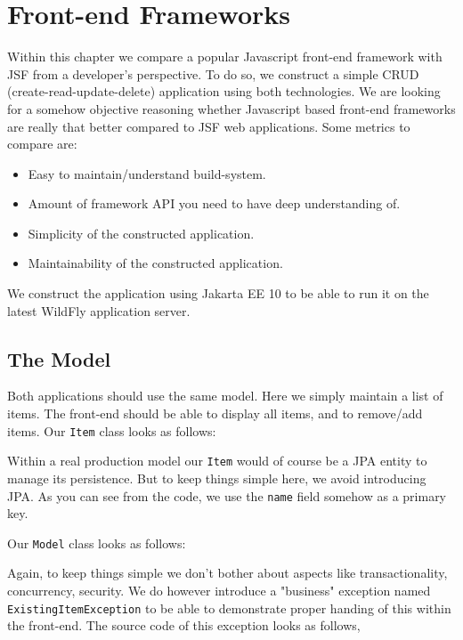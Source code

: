 %

\chapter{Front-end Frameworks}
Within this chapter we compare a popular Javascript front-end framework with JSF from a developer's perspective.
To do so, we construct a simple CRUD (create-read-update-delete) application using both technologies.
We are looking for a somehow objective reasoning whether Javascript based front-end frameworks are really that better compared to JSF web applications.
Some metrics to compare are:
\begin{itemize}
	\item Easy to maintain/understand build-system.
	\item Amount of framework API you need to have deep understanding of.
	\item Simplicity of the constructed application.
	\item Maintainability of the constructed application.
\end{itemize}
We construct the application using Jakarta EE 10 to be able to run it on the latest WildFly application server.


\section{The Model}
Both applications should use the same model.
Here we simply maintain a list of items.
The front-end should be able to display all items, and to remove/add items.
Our \texttt{Item} class looks as follows:

Within a real production model our \texttt{Item} would of course be a JPA entity to manage its persistence.
But to keep things simple here, we avoid introducing JPA.
As you can see from the code, we use the \texttt{name} field somehow as a primary key.

Our \texttt{Model} class looks as follows:

Again, to keep things simple we don't bother about aspects like transactionality, concurrency, security.
We do however introduce a "business" exception named \texttt{ExistingItem\allowbreak Exception} to be able to demonstrate proper handing of this within the front-end.
The source code of this exception looks as follows,


